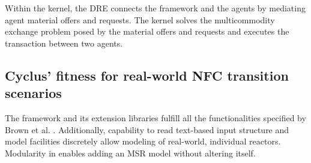 Within the \Cyclus kernel, the \gls{DRE} connects
the framework and the agents by mediating agent material
offers and requests.
The kernel solves the multicommodity exchange problem
posed by the material offers and requests and executes
the transaction between two agents.

\subsection{Cyclus' fitness for real-world \gls{NFC} transition scenarios}
The \Cyclus framework and its extension libraries fulfill all the functionalities
specified by Brown et al. \cite{brown_identification_2016}.  Additionally,
\Cyclus capability to read text-based input structure and model facilities discretely
allow modeling of real-world, individual reactors. 
Modularity in \Cyclus enables adding an \gls{MSR} model without altering \Cyclus
itself.

